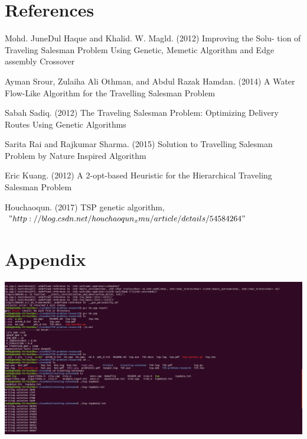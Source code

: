 \documentclass[a4paper,man,natbib]{apa6}
\begin{document}
\newpage
\section{References}
Mohd. JuneDul Haque and Khalid. W. Magld. (2012) Improving the Solu-
tion of Traveling Salesman Problem Using Genetic, Memetic Algorithm and
Edge assembly Crossover
 
Ayman Srour, Zulaiha Ali Othman, and Abdul Razak Hamdan. (2014) A
Water Flow-Like Algorithm for the Travelling Salesman Problem

Sabah Sadiq. (2012) The Traveling Salesman Problem: Optimizing Delivery
Routes Using Genetic Algorithms

Sarita Rai and Rajkumar Sharma. (2015) Solution to Travelling Salesman
Problem by Nature Inspired Algorithm

Eric Kuang. (2012) A 2-opt-based Heuristic for the Hierarchical Traveling
Salesman Problem

Houchaoqun. (2017) TSP genetic algorithm, $"http://blog.csdn.net/houchaoqun_xmu/article/details/54584264"$


\newpage
\section{Appendix}
\includegraphics[width=1\linewidth]{4}
\end{document}
